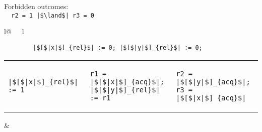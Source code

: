 \begin{minipage}[t]{0.3\linewidth}
Forbidden outcomes:\\
\lstinline{  r2 = 1 |$\land$| r3 = 0}\\
\end{minipage}
%
\begin{minipage}[t]{0.3\linewidth}
\vspace{-.2cm}
  \begin{tabular}{l@{\ \ \ }l}
    \begin{minipage}[l]{4.3cm} \small
\begin{lstlisting}
        |$[$|x|$]_{rel}$| := 0; |$[$|y|$]_{rel}$| := 0;
\end{lstlisting}
\vspace{-.2cm}
\begin{tabular}{l||l||l}
\begin{lstlisting}
|$[$|x|$]_{rel}$| := 1
\end{lstlisting}
\hspace{.6cm}
&
\begin{lstlisting}
r1 = |$[$|x|$]_{acq}$|;
|$[$|y|$]_{rel}$| := r1
\end{lstlisting}
\hspace{.6cm}
&
\begin{lstlisting}
r2 = |$[$|y|$]_{acq}$|;
r3 = |$[$|x|$]_{acq}$|
\end{lstlisting}
\end{tabular}
    \end{minipage}
&
  \end{tabular}
\end{minipage}
\litmusTestEnd

